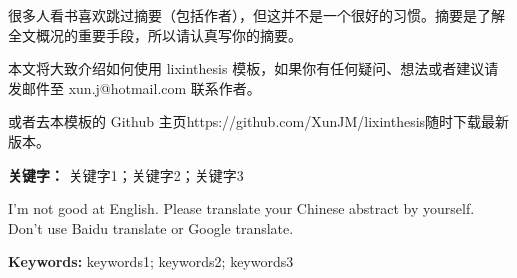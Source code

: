 \thispagestyle{empty}
\begin{cnabstract}
	很多人看书喜欢跳过摘要（包括作者），但这并不是一个很好的习惯。摘要是了解全文概况的重要手段，所以请认真写你的摘要。
	
	本文将大致介绍如何使用 lixinthesis 模板，如果你有任何疑问、想法或者建议请发邮件至 {\sf xun.j@hotmail.com} 联系作者。
	
	或者去本模板的 Github 主页{\sf https://github.com/XunJM/lixinthesis}随时下载最新版本。
	
	\noindent	
	\textbf{关键字：} 关键字1；关键字2；关键字3
\end{cnabstract}
\clearpage\thispagestyle{empty}
\begin{enabstract}\sf
	I'm not good at English. Please translate your Chinese abstract by yourself. Don't use Baidu translate or Google translate.
	
	\noindent
	\textbf{Keywords:} keywords1; keywords2; keywords3

\end{enabstract}